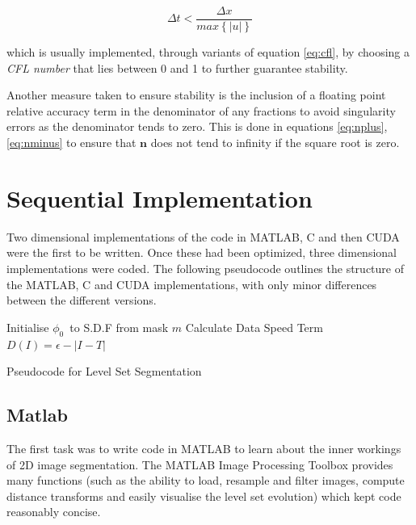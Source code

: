 \begin{equation}
\Delta t < \frac{\Delta x}{max\left\{|u|\right\}}
\label{eq:cfl}
\end{equation}

which is usually implemented, through variants of equation \eqref{eq:cfl}, by choosing a \textit{CFL number} that lies between 0 and 1 to further guarantee stability.

Another measure taken to ensure stability is the inclusion of a floating point relative accuracy term in the denominator of any fractions to avoid singularity errors as the denominator tends to zero. This is done in equations \eqref{eq:nplus},\eqref{eq:nminus} to ensure that $\textbf{n}$ does not tend to infinity if the square root is zero.

\section{Sequential Implementation}
Two dimensional implementations of the code in MATLAB, C and then CUDA were the first to be written. Once these had been optimized, three dimensional implementations were coded. The following pseudocode outlines the structure of the MATLAB, C and CUDA implementations, with only minor differences between the different versions.

\begin{algorithm}[h]
\BlankLine
\dontprintsemicolon
{}
\BlankLine
\SetLine
Initialise $\phi_0$\ to S.D.F from mask $m$\;
Calculate Data Speed Term $D(I)= \epsilon - |I-T|$\;
\caption{Pseudocode for Level Set Segmentation}\label{alg:alg}
\end{algorithm}


	\subsection{Matlab}
The first task was to write code in MATLAB to learn about the inner workings of 2D image segmentation. The MATLAB Image Processing Toolbox provides many functions (such as the ability to load, resample and filter images, compute distance transforms and easily visualise the level set evolution) which kept code reasonably concise. 

